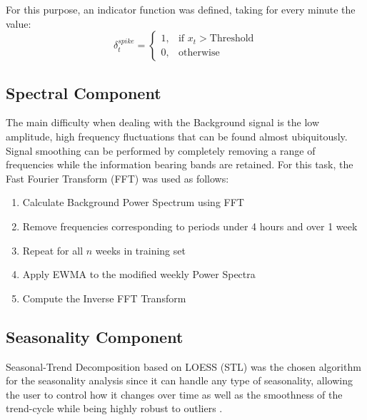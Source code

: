\documentclass[letterpaper, 10 pt, conference]{ieeeconf}  %
\begin{document}

For this purpose, an indicator function was defined, taking for every minute the value:
\begin{equation}
    \delta_t^{spike}=
    \begin{cases}
      1, & \text{if } x_t > \text{Threshold}\\
      0, & \text{otherwise}
    \end{cases}
    \label{delta}
  \end{equation}

\subsection{Spectral Component}
The main difficulty when dealing with the Background signal is the low amplitude, high frequency fluctuations that can be found almost ubiquitously. 
Signal smoothing can be performed by completely removing a range of frequencies while the information bearing bands are retained. For this task, the Fast Fourier Transform (FFT) \cite{FFT} was used as follows:
\begin{enumerate}

	\item Calculate Background Power Spectrum using FFT
	\item Remove frequencies corresponding to periods under 4 hours and over 1 week
	\item Repeat for all $n$ weeks in training set
    \item Apply EWMA to the modified weekly Power Spectra
	\item Compute the Inverse FFT Transform

\end{enumerate}
\subsection{Seasonality Component}
Seasonal-Trend Decomposition based on LOESS (STL) \cite{STL} was the chosen algorithm for the seasonality analysis since it can handle any type of seasonality, allowing the user to control how it changes over time as well as the smoothness of the trend-cycle while being highly robust to outliers \cite{forecasting}.\\
\end{document}
